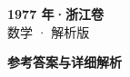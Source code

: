 \documentclass[zihao=-4, a4paper]{ctexart}
\begin{document}
\begin{center}
  {\Large\bfseries 1977 年·浙江卷}\\[4pt]
  {\large 数学 · 解析版}
\end{center}
\medskip
{}

\clearpage
{}
\begin{center}{\Large\bfseries 参考答案与详细解析}\end{center}
\medskip

\end{document}
